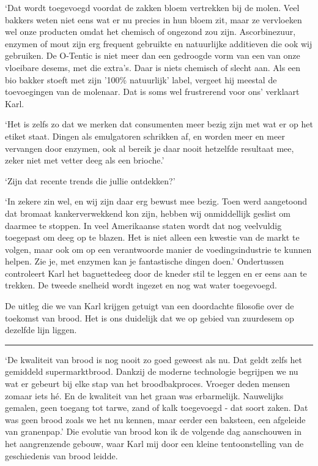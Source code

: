 \documentclass[
  11pt,
  dutch,
]{memoir}
\begin{document}
`Dat wordt toegevoegd voordat de zakken bloem vertrekken bij de molen.
Veel bakkers weten niet eens wat er nu precies in hun bloem zit, maar ze
vervloeken wel onze producten omdat het chemisch of ongezond zou zijn.
Ascorbinezuur, enzymen of mout zijn erg frequent gebruikte en
natuurlijke additieven die ook wij gebruiken. De O-Tentic is niet meer
dan een gedroogde vorm van een van onze vloeibare desems, met die
extra's. Daar is niets chemisch of slecht aan. Als een bio bakker stoeft
met zijn '100\% natuurlijk' label, vergeet hij meestal de toevoegingen
van de molenaar. Dat is soms wel frustrerend voor ons' verklaart Karl.

`Het is zelfs zo dat we merken dat consumenten meer bezig zijn met wat
er op het etiket staat. Dingen als emulgatoren schrikken af, en worden
meer en meer vervangen door enzymen, ook al bereik je daar nooit
hetzelfde resultaat mee, zeker niet met vetter deeg als een brioche.'

`Zijn dat recente trends die jullie ontdekken?'

`In zekere zin wel, en wij zijn daar erg bewust mee bezig. Toen werd
aangetoond dat bromaat kankerverwekkend kon zijn, hebben wij
onmiddellijk geslist om daarmee te stoppen. In veel Amerikaanse staten
wordt dat nog veelvuldig toegepast om deeg op te blazen. Het is niet
alleen een kwestie van de markt te volgen, maar ook om op een
verantwoorde manier de voedingsindustrie te kunnen helpen. Zie je, met
enzymen kan je fantastische dingen doen.' Ondertussen controleert Karl
het baguettedeeg door de kneder stil te leggen en er eens aan te
trekken. De tweede snelheid wordt ingezet en nog wat water toegevoegd.

De uitleg die we van Karl krijgen getuigt van een doordachte filosofie
over de toekomst van brood. Het is ons duidelijk dat we op gebied van
zuurdesem op dezelfde lijn liggen.

\pfbreak

`De kwaliteit van brood is nog nooit zo goed geweest als nu. Dat geldt
zelfs het gemiddeld supermarktbrood. Dankzij de moderne technologie
begrijpen we nu wat er gebeurt bij elke stap van het broodbakproces.
Vroeger deden mensen zomaar iets hé. En de kwaliteit van het graan was
erbarmelijk. Nauwelijks gemalen, geen toegang tot tarwe, zand of kalk
toegevoegd - dat soort zaken. Dat was geen brood zoals we het nu kennen,
maar eerder een baksteen, een afgeleide van granenpap.' Die evolutie van
brood kon ik de volgende dag aanschouwen in het aangrenzende gebouw,
waar Karl mij door een kleine tentoonstelling van de geschiedenis van
brood leidde.
\end{document}
